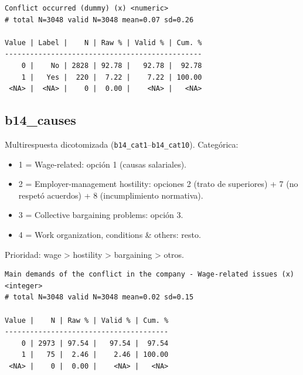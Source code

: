 \documentclass[
  letterpaper,
  DIV=11,
  numbers=noendperiod]{scrreprt}
\newenvironment{Shaded}{\begin{snugshade}}{\end{snugshade}}
\newcommand{\FunctionTok}[1]{\textcolor[rgb]{0.28,0.35,0.67}{#1}}
\newcommand{\NormalTok}[1]{\textcolor[rgb]{0.00,0.23,0.31}{#1}}
\newcommand{\SpecialCharTok}[1]{\textcolor[rgb]{0.37,0.37,0.37}{#1}}
\providecommand{\tightlist}{%
  \setlength{\itemsep}{0pt}\setlength{\parskip}{0pt}}
\begin{document}
\begin{verbatim}
Conflict occurred (dummy) (x) <numeric> 
# total N=3048 valid N=3048 mean=0.07 sd=0.26

Value | Label |    N | Raw % | Valid % | Cum. %
-----------------------------------------------
    0 |    No | 2828 | 92.78 |   92.78 |  92.78
    1 |   Yes |  220 |  7.22 |    7.22 | 100.00
 <NA> |  <NA> |    0 |  0.00 |    <NA> |   <NA>
\end{verbatim}

\subsection{b14\_causes}\label{b14_causes}

Multirespuesta dicotomizada (\texttt{b14\_cat1}--\texttt{b14\_cat10}).
Categórica:

\begin{itemize}
\tightlist
\item
  1 = Wage-related: opción 1 (causas salariales).
\item
  2 = Employer-management hostility: opciones 2 (trato de superiores) +
  7 (no respetó acuerdos) + 8 (incumplimiento normativa).
\item
  3 = Collective bargaining problems: opción 3.
\item
  4 = Work organization, conditions \& others: resto.
\end{itemize}

Prioridad: wage \textgreater{} hostility \textgreater{} bargaining
\textgreater{} otros.

\begin{Shaded}
\end{Shaded}

\begin{verbatim}
Main demands of the conflict in the company - Wage-related issues (x) <integer> 
# total N=3048 valid N=3048 mean=0.02 sd=0.15

Value |    N | Raw % | Valid % | Cum. %
---------------------------------------
    0 | 2973 | 97.54 |   97.54 |  97.54
    1 |   75 |  2.46 |    2.46 | 100.00
 <NA> |    0 |  0.00 |    <NA> |   <NA>
\end{verbatim}
\end{document}
